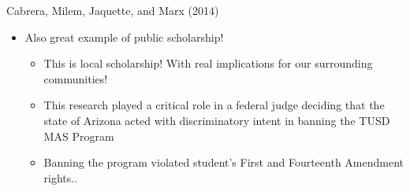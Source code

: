 \documentclass[8pt,ignorenonframetext,dvipsnames]{beamer}
\providecommand{\tightlist}{%
  \setlength{\itemsep}{0pt}\setlength{\parskip}{0pt}}
\let\olditem\item
\renewcommand{\item}{%
  \olditem\vspace{4pt}
}
\begin{document}
\begin{frame}{Cabrera, Milem, Jaquette, and Marx (2014)}
\begin{itemize}
  \begin{itemize}
  \tightlist
  \item
    Cabrera, Milem, Jaquette, and Marx (2014) is a great example of
    this!
  \end{itemize}
\item
  Also great example of public scholarship!

  \begin{itemize}
  \tightlist
  \item
    This is local scholarship! With real implications for our
    surrounding communities!
  \item
    This research played a critical role in a federal judge deciding
    that the state of Arizona acted with discriminatory intent in
    banning the TUSD MAS Program
  \item
    Banning the program violated student's First and Fourteenth
    Amendment rights..
  \end{itemize}
\end{itemize}

\end{frame}
\end{document}
